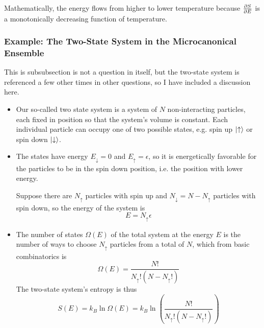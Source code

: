 \documentclass[11pt, a4paper]{article}
\begin{document}
\begin{itemize}
	Mathematically, the energy flows from higher to lower temperature because $ \pdv{S}{E} $ is a monotonically decreasing function of temperature.
\end{itemize}

\subsubsection{Example: The Two-State System in the Microcanonical Ensemble} \label{sss:two_state_mce}
This is subsubsection is not a question in itself, but the two-state system is referenced a few other times in other questions, so I have included a discussion here.
\begin{itemize}
	\item Our so-called two state system is a system of $ N $ non-interacting particles, each fixed in position so that the system's volume is constant. Each individual particle can occupy one of two possible states, e.g. spin up $ \ket{\uparrow} $ or spin down $ \ket{\downarrow} $. 
	
	\item The states have energy $ E_{\downarrow} = 0$ and $ E_{\uparrow} = \epsilon $, so it is energetically favorable for the particles to be in the spin down position, i.e. the position with lower energy. 
	
	Suppose there are $ N_{\uparrow} $ particles with spin up and $ N_{\downarrow} = N - N_{\uparrow}$ particles with spin down, so the energy of the system is 
	\begin{equation*}
		E = N_{\uparrow} \epsilon
	\end{equation*}
	
	\item The number of states $ \Omega(E) $ of the total system at the energy $ E $ is the number of ways to choose $ N_{\uparrow} $ particles from a total of $ N $, which from basic combinatorics is 
	\begin{equation*}
		\Omega(E) = \frac{N!}{N_{\uparrow}!(N - N_{\uparrow}!)}
	\end{equation*}
	The two-state system's entropy is thus
	\begin{equation*}
		S(E) = k_{B}\ln \Omega(E) = k_{B} \ln(\frac{N!}{N_{\uparrow}!(N - N_{\uparrow}!)})
	\end{equation*}
	

\end{itemize}
\end{document}
